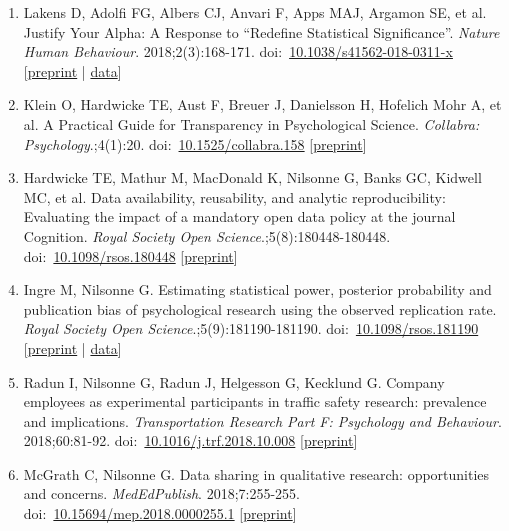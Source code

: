 \documentclass[10pt,a4paper,twocolumn]{article}
\begin{document}
\begin{enumerate}
    \item Lakens D, Adolfi FG, Albers CJ, Anvari F, Apps MAJ, Argamon SE, et al. Justify Your Alpha: A Response to “Redefine Statistical Significance”. \textit{Nature Human Behaviour}. 2018;2(3):168-171. doi:~\href{https://doi.org/10.1038/s41562-018-0311-x}{10.1038/s41562-018-0311-x} [\href{https://psyarxiv.com/9s3y6}{preprint} | \href{https://osf.io/by2kc/}{data}]

    \item Klein O, Hardwicke TE, Aust F, Breuer J, Danielsson H, Hofelich Mohr A, et al. A Practical Guide for Transparency in Psychological Science. \textit{Collabra: Psychology}.;4(1):20. doi:~\href{https://doi.org/10.1525/collabra.158}{10.1525/collabra.158} [\href{https://doi.org/10.17605/OSF.IO/RTYGM}{preprint}]

    \item Hardwicke TE, Mathur M, MacDonald K, Nilsonne G, Banks GC, Kidwell MC, et al. Data availability, reusability, and analytic reproducibility: Evaluating the impact of a mandatory open data policy at the journal Cognition. \textit{Royal Society Open Science}.;5(8):180448-180448. doi:~\href{https://doi.org/10.1098/rsos.180448}{10.1098/rsos.180448} [\href{https://doi.org/10.17605/OSF.IO/39CFB}{preprint}]

    \item Ingre M, Nilsonne G. Estimating statistical power, posterior probability and publication bias of psychological research using the observed replication rate. \textit{Royal Society Open Science}.;5(9):181190-181190. doi:~\href{https://doi.org/10.1098/rsos.181190}{10.1098/rsos.181190} [\href{https://doi.org/10.6084/m9.figshare.5573113}{preprint} | \href{https://github.com/micing/publication_bias_psychology}{data}]

    \item Radun I, Nilsonne G, Radun J, Helgesson G, Kecklund G. Company employees as experimental participants in traffic safety research: prevalence and implications. \textit{Transportation Research Part F: Psychology and Behaviour}. 2018;60:81-92. doi:~\href{https://doi.org/10.1016/j.trf.2018.10.008}{10.1016/j.trf.2018.10.008} [\href{http://hdl.handle.net/10616/46553}{preprint}]

    \item McGrath C, Nilsonne G. Data sharing in qualitative research: opportunities and concerns. \textit{MedEdPublish}. 2018;7:255-255. doi:~\href{https://doi.org/10.15694/mep.2018.0000255.1}{10.15694/mep.2018.0000255.1} [\href{https://doi.org/10.31219/osf.io/ewyjb}{preprint}]


\end{enumerate}
\end{document}
